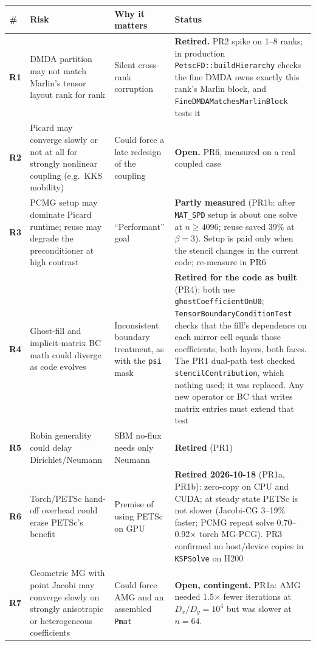 \documentclass[11pt]{article}
\begin{document}
\begin{longtable}{>{\bfseries}p{} p{} p{} p{}}
\toprule
\# & Risk & Why it matters & Status \\
\midrule
\endhead
R1 & DMDA partition may not match Marlin's tensor layout rank for rank &
Silent cross-rank corruption & \textbf{Retired.} PR2 spike on 1--8 ranks;
in production \texttt{PetscFD::buildHierarchy} checks the fine DMDA owns
exactly this rank's Marlin block, and \texttt{FineDMDAMatchesMarlinBlock}
tests it \\
R2 & Picard may converge slowly or not at all for strongly nonlinear
coupling (e.g.\ KKS mobility) & Could force a late redesign of the coupling
& \textbf{Open.} PR6, measured on a real coupled case \\
R3 & PCMG setup may dominate Picard runtime; reuse may degrade the
preconditioner at high contrast & ``Performant'' goal & \textbf{Partly
measured} (PR1b: after \texttt{MAT\_SPD} setup is about one solve at
$n\ge4096$; reuse saved 39\% at $\beta=3$). Setup is paid only when the
stencil changes in the current code; re-measure in PR6 \\
R4 & Ghost-fill and implicit-matrix BC math could diverge as code evolves &
Inconsistent boundary treatment, as with the \texttt{psi} mask & \textbf{Retired
for the code as built} (PR4): both use \texttt{ghostCoefficientOnU0};
\texttt{TensorBoundaryConditionTest} checks that the fill's dependence on
each mirror cell equals those coefficients, both layers, both faces. The PR1
dual-path test checked \texttt{stencilContribution}, which nothing used; it
was replaced. Any new operator or BC that writes matrix entries must extend
that test \\
R5 & Robin generality could delay Dirichlet/Neumann & SBM no-flux needs only
Neumann & \textbf{Retired} (PR1) \\
R6 & Torch/PETSc hand-off overhead could erase PETSc's benefit & Premise of
using PETSc on GPU & \textbf{Retired 2026-10-18} (PR1a, PR1b): zero-copy on
CPU and CUDA; at steady state PETSc is not slower (Jacobi-CG 3--19\% faster;
PCMG repeat solve 0.70--0.92$\times$ torch MG-PCG). PR3 confirmed no
host/device copies in \texttt{KSPSolve} on H200 \\
R7 & Geometric MG with point Jacobi may converge slowly on strongly
anisotropic or heterogeneous coefficients & Could force AMG and an
assembled \texttt{Pmat} & \textbf{Open, contingent.} PR1a: AMG needed
1.5$\times$ fewer iterations at $D_x/D_y=10^4$ but was slower at $n=64$.

\end{longtable}
\end{document}
